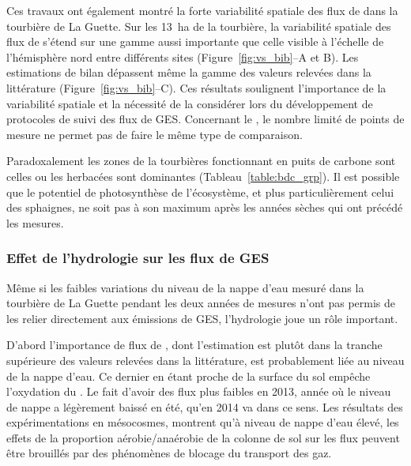Ces travaux ont également montré la forte variabilité spatiale des flux de \coo dans la tourbière de La Guette.
Sur les \SI{13}{\hectare} de la tourbière, la variabilité spatiale des flux de \coo s'étend sur une gamme aussi importante que celle visible à l'échelle de l'hémisphère nord entre différents sites (Figure~\ref{fig:vs_bib}--A et B).
Les estimations de bilan dépassent même la gamme des valeurs relevées dans la littérature (Figure~\ref{fig:vs_bib}--C).
Ces résultats soulignent l'importance de la variabilité spatiale et la nécessité de la considérer lors du développement de protocoles de suivi des flux de GES.
Concernant le \chh, le nombre limité de points de mesure ne permet pas de faire le même type de comparaison.

Paradoxalement les zones de la tourbières fonctionnant en puits de carbone sont celles ou les herbacées sont dominantes (Tableau~\ref{table:bdc_grp}).
Il est possible que le potentiel de photosynthèse de l'écosystème, et plus particulièrement celui des sphaignes, ne soit pas à son maximum après les années sèches qui ont précédé les mesures.

\subsubsection{Effet de l'hydrologie sur les flux de GES}

Même si les faibles variations du niveau de la nappe d'eau mesuré dans la tourbière de La Guette pendant les deux années de mesures n'ont pas permis de les relier directement aux émissions de GES, l'hydrologie joue un rôle important.

D'abord l'importance de flux de \chh, dont l'estimation est plutôt dans la tranche supérieure des valeurs relevées dans la littérature, est probablement liée au niveau de la nappe d'eau.
Ce dernier en étant proche de la surface du sol empêche l'oxydation du \chh.
Le fait d'avoir des flux plus faibles en 2013, année où le niveau de nappe a légèrement baissé en été, qu'en 2014 va dans ce sens.
Les résultats des expérimentations en mésocosmes, montrent qu'à niveau de nappe d'eau élevé, les effets de la proportion aérobie/anaérobie de la colonne de sol sur les flux peuvent être brouillés par des phénomènes de blocage du transport des gaz.

